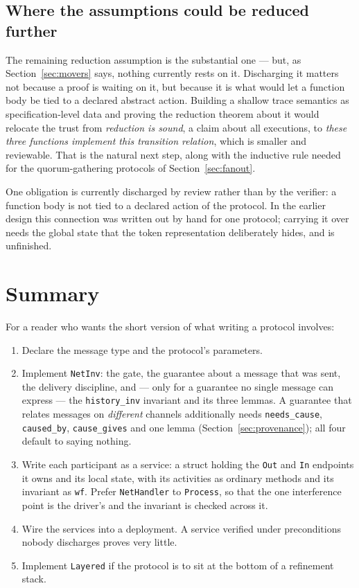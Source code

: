 \documentclass[11pt]{article}
\newcommand{\code}[1]{\texttt{#1}}
\begin{document}
\subsection*{Where the assumptions could be reduced further}

The remaining reduction assumption is the substantial one --- but, as
Section~\ref{sec:movers} says, nothing currently rests on it. Discharging it
matters not because a proof is waiting on it, but because it is what would let a
function body be tied to a declared abstract action. Building a shallow trace
semantics as specification-level data and proving the reduction theorem about it
would relocate the trust from \emph{reduction is sound}, a claim about all
executions, to \emph{these three functions implement this transition relation},
which is smaller and reviewable. That is the natural next step, along with the
inductive rule needed for the quorum-gathering protocols of
Section~\ref{sec:fanout}.

One obligation is currently discharged by review rather than by the verifier: a
function body is not tied to a declared action of the protocol. In the earlier
design this connection was written out by hand for one protocol; carrying it
over needs the global state that the token representation deliberately hides,
and is unfinished.

\section{Summary}\label{sec:summary}

For a reader who wants the short version of what writing a protocol involves:

\begin{enumerate}[leftmargin=1.4em,itemsep=3pt,topsep=3pt]
\item Declare the message type and the protocol's parameters.
\item Implement \code{NetInv}: the gate, the guarantee about a message that was
  sent, the delivery discipline, and --- only for a guarantee no single message
  can express --- the \code{history\_inv} invariant and its three lemmas. A guarantee
  that relates messages on \emph{different} channels additionally needs
  \code{needs\_cause}, \code{caused\_by}, \code{cause\_gives} and one lemma
  (Section~\ref{sec:provenance}); all four default to saying nothing.
\item Write each participant as a service: a struct holding the \code{Out} and
  \code{In} endpoints it owns and its local state, with its activities as
  ordinary methods and its invariant as \code{wf}. Prefer \code{NetHandler} to
  \code{Process}, so that the one interference point is the driver's and the
  invariant is checked across it.
\item Wire the services into a deployment. A service verified under
  preconditions nobody discharges proves very little.
\item Implement \code{Layered} if the protocol is to sit at the bottom of a
  refinement stack.
\end{enumerate}
\end{document}
